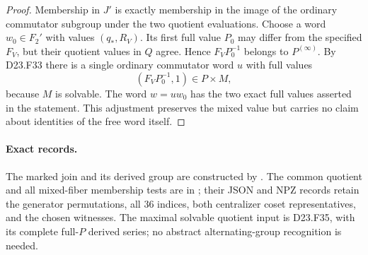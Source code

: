 \begin{proof}
Membership in $J'$ is exactly membership in the image
of the ordinary commutator subgroup under the two
quotient evaluations. Choose a word $w_0\in F_2'$
with values $(q_*,R_V)$. Its first full value $P_0$ may
differ from the specified $F_V$, but their quotient
values in $Q$ agree. Hence $F_VP_0^{-1}$ belongs to
$P^{(\infty)}$. By D23.F33 there is a single ordinary
commutator word $u$ with full values
\[
                 (F_VP_0^{-1},1)\in P\times M,
\]
because $M$ is solvable. The word $w=uw_0$ has
the two exact full values asserted in the statement.
This adjustment preserves the mixed value but carries
no claim about identities of the free word itself.
\end{proof}

\paragraph{Exact records.}
The marked join and its derived group are constructed by
. The common
quotient and all mixed-fiber membership tests are in
; their JSON
and NPZ records retain the generator permutations,
all $36$ indices, both centralizer coset representatives,
and the chosen witnesses. The maximal solvable quotient
input is D23.F35, with its complete full-$P$ derived
series; no abstract alternating-group recognition is
needed.
